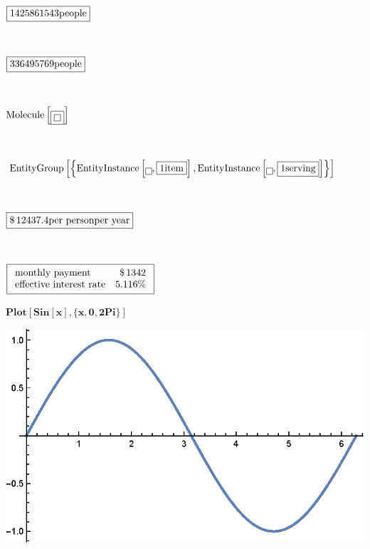 \documentclass{article}
\begin{document}
\(\)

\begin{doublespace}
\noindent\(\fbox{$1425861543\text{people}$}\)
\end{doublespace}

\(\)

\begin{doublespace}
\noindent\(\fbox{$336495769\text{people}$}\)
\end{doublespace}

\(\)

\begin{doublespace}
\noindent\(\text{Molecule}\left[\fbox{$\fbox{$$}$}\right]\)
\end{doublespace}

\(\)

\begin{doublespace}
\noindent\(\text{EntityGroup}\left[\left\{\text{EntityInstance}\left[\fbox{$$},\fbox{$1\text{item}$}\right],\text{EntityInstance}\left[\fbox{$$},\fbox{$1\text{serving}$}\right]\right\}\right]\)
\end{doublespace}

\(\)

\begin{doublespace}
\noindent\(\fbox{$\$\, 12437.4\text{per }\text{person}\text{per }\text{year}$}\)
\end{doublespace}

\(\)

\begin{doublespace}
\noindent\(\fbox{$
\begin{array}{lr}
 \text{monthly payment} & \$\, 1342 \\
 \text{effective interest rate} & 5.116\% \\
\end{array}
$}\)
\end{doublespace}

\begin{doublespace}
\noindent\(\pmb{\text{Plot}[\text{Sin}[x],\{x,0,2\text{Pi}\}]}\)
\end{doublespace}

\includegraphics{WLG_gr11.eps}
\end{document}
